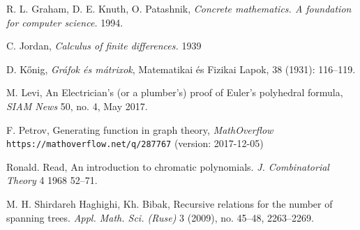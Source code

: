 \begin{thebibliography}{52}
 R. L. Graham, D. E. Knuth, O. Patashnik, 
\emph{Concrete mathematics. A foundation for computer science.}
1994.

 C. Jordan, 
\emph{Calculus of finite differences.}
1939

 D. K\H{o}nig, \emph{Gr\'{a}fok \'{e}s m\'{a}trixok}, Matematikai és Fizikai Lapok, 38 (1931): 116--119.

 M. Levi,
An Electrician’s (or a plumber’s)
proof of Euler’s polyhedral formula,
\emph{SIAM News} 50, no. 4, May 2017.

 F. Petrov, Generating function in graph theory,
\emph{MathOverflow}
\texttt{https://mathoverflow.net/q/287767} (version: 2017-12-05)

 Ronald. Read, 
An introduction to chromatic polynomials.
\emph{J. Combinatorial Theory} 4 1968 52--71.

 M. H. Shirdareh Haghighi, Kh. Bibak, 
Recursive relations for the number of spanning trees. 
\emph{Appl. Math. Sci. (Ruse)} 3 (2009), no. 45--48, 2263--2269.
\end{thebibliography}

